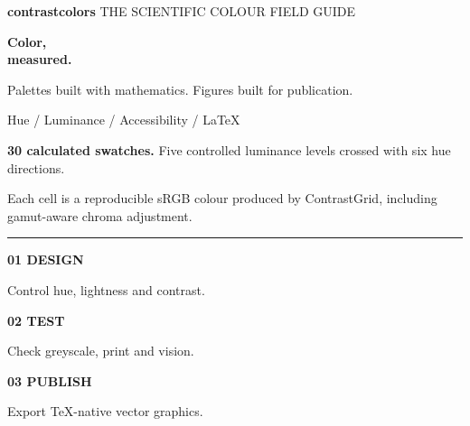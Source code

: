\documentclass[10pt,twocolumn,a4paper]{article}
\begin{document}
\onecolumn
\begin{titlepage}
\pagecolor{CoverInk}
\color{white}
\thispagestyle{empty}
\vspace*{-1.40cm}
\noindent
{\sffamily\bfseries\large\textcolor{CoverOrange}{contrastcolors}}
\hfill{\sffamily\footnotesize\textcolor{CoverMuted}{THE SCIENTIFIC COLOUR FIELD GUIDE}}\par

\vspace{1.65cm}
\noindent
{\sffamily\bfseries\fontsize{45}{49}\selectfont
 Color,\\measured.\par}
\vspace{.45cm}
\noindent
{\sffamily\fontsize{15}{20}\selectfont\textcolor{CoverSoft}{
 Palettes built with mathematics. Figures built for publication.}\par}
\vspace{.30cm}
\noindent
{\sffamily\small\textcolor{CoverMuted}{
 Hue \quad / \quad Luminance \quad / \quad Accessibility \quad / \quad LaTeX}\par}

\vspace{1.15cm}
\par\noindent\makebox[\linewidth][c]{}\par

\vspace{.43cm}
\noindent
{\sffamily\small\textcolor{CoverSoft}{
 \textbf{30 calculated swatches.} Five controlled luminance levels
 crossed with six hue directions.}\par}
\vspace{.12cm}
\noindent
{\sffamily\footnotesize\textcolor{CoverMuted}{
 Each cell is a reproducible sRGB colour produced by ContrastGrid,
 including gamut-aware chroma adjustment.}\par}

\vfill
\noindent\textcolor{CoverMuted}{\rule{\linewidth}{.35pt}}\par
\vspace{.34cm}
\noindent
\begin{minipage}[t]{.30\linewidth}
 {\sffamily\bfseries\textcolor{CoverOrange}{01 \quad DESIGN}}\par
 {\sffamily\footnotesize\textcolor{CoverSoft}{Control hue, lightness and contrast.}}
\end{minipage}\hfill
\begin{minipage}[t]{.30\linewidth}
 {\sffamily\bfseries\textcolor{CoverOrange}{02 \quad TEST}}\par
 {\sffamily\footnotesize\textcolor{CoverSoft}{Check greyscale, print and vision.}}
\end{minipage}\hfill
\begin{minipage}[t]{.30\linewidth}
 {\sffamily\bfseries\textcolor{CoverOrange}{03 \quad PUBLISH}}\par
 {\sffamily\footnotesize\textcolor{CoverSoft}{Export TeX-native vector graphics.}}
\end{minipage}\par
\vspace{.42cm}


\end{titlepage}
\end{document}
